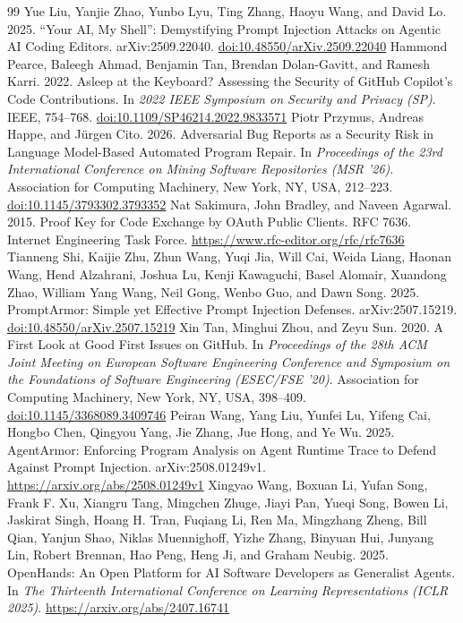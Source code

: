 \documentclass[acmsmall,screen,nonacm]{acmart}
\providecommand{\doi}[1]{\href{https://doi.org/#1}{doi:#1}}
\begin{document}
\begin{thebibliography}{99}
 Yue Liu, Yanjie Zhao, Yunbo Lyu, Ting Zhang, Haoyu Wang, and David Lo. 2025. ``Your AI, My Shell'': Demystifying Prompt Injection Attacks on Agentic AI Coding Editors. arXiv:2509.22040. \doi{10.48550/arXiv.2509.22040}
 Hammond Pearce, Baleegh Ahmad, Benjamin Tan, Brendan Dolan-Gavitt, and Ramesh Karri. 2022. Asleep at the Keyboard? Assessing the Security of GitHub Copilot's Code Contributions. In \emph{2022 IEEE Symposium on Security and Privacy (SP)}. IEEE, 754--768. \doi{10.1109/SP46214.2022.9833571}
 Piotr Przymus, Andreas Happe, and J\"urgen Cito. 2026. Adversarial Bug Reports as a Security Risk in Language Model-Based Automated Program Repair. In \emph{Proceedings of the 23rd International Conference on Mining Software Repositories (MSR '26)}. Association for Computing Machinery, New York, NY, USA, 212--223. \doi{10.1145/3793302.3793352}
 Nat Sakimura, John Bradley, and Naveen Agarwal. 2015. Proof Key for Code Exchange by OAuth Public Clients. RFC 7636. Internet Engineering Task Force. \url{https://www.rfc-editor.org/rfc/rfc7636}
 Tianneng Shi, Kaijie Zhu, Zhun Wang, Yuqi Jia, Will Cai, Weida Liang, Haonan Wang, Hend Alzahrani, Joshua Lu, Kenji Kawaguchi, Basel Alomair, Xuandong Zhao, William Yang Wang, Neil Gong, Wenbo Guo, and Dawn Song. 2025. PromptArmor: Simple yet Effective Prompt Injection Defenses. arXiv:2507.15219. \doi{10.48550/arXiv.2507.15219}
 Xin Tan, Minghui Zhou, and Zeyu Sun. 2020. A First Look at Good First Issues on GitHub. In \emph{Proceedings of the 28th ACM Joint Meeting on European Software Engineering Conference and Symposium on the Foundations of Software Engineering (ESEC/FSE '20)}. Association for Computing Machinery, New York, NY, USA, 398--409. \doi{10.1145/3368089.3409746}
 Peiran Wang, Yang Liu, Yunfei Lu, Yifeng Cai, Hongbo Chen, Qingyou Yang, Jie Zhang, Jue Hong, and Ye Wu. 2025. AgentArmor: Enforcing Program Analysis on Agent Runtime Trace to Defend Against Prompt Injection. arXiv:2508.01249v1. \url{https://arxiv.org/abs/2508.01249v1}
 Xingyao Wang, Boxuan Li, Yufan Song, Frank F. Xu, Xiangru Tang, Mingchen Zhuge, Jiayi Pan, Yueqi Song, Bowen Li, Jaskirat Singh, Hoang H. Tran, Fuqiang Li, Ren Ma, Mingzhang Zheng, Bill Qian, Yanjun Shao, Niklas Muennighoff, Yizhe Zhang, Binyuan Hui, Junyang Lin, Robert Brennan, Hao Peng, Heng Ji, and Graham Neubig. 2025. OpenHands: An Open Platform for AI Software Developers as Generalist Agents. In \emph{The Thirteenth International Conference on Learning Representations (ICLR 2025)}. \url{https://arxiv.org/abs/2407.16741}

\end{thebibliography}
\end{document}
